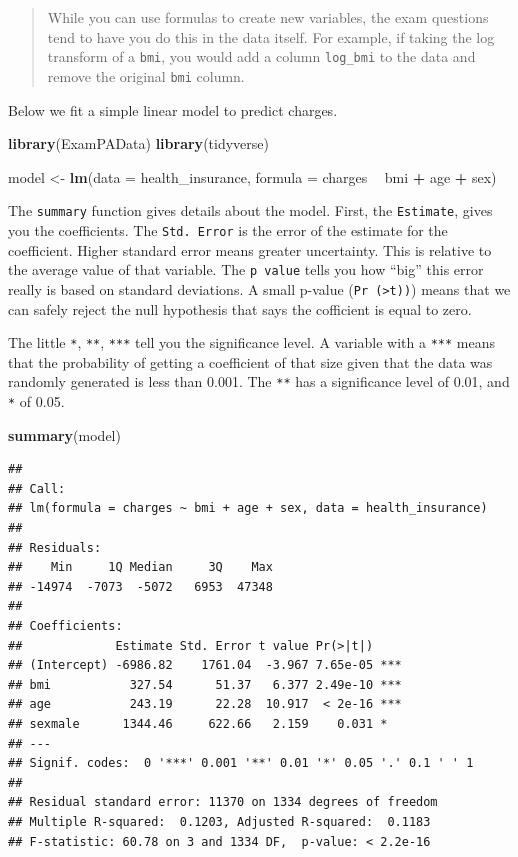 \documentclass[openany]{book}
\newenvironment{Shaded}{\begin{snugshade}}{\end{snugshade}}
\newcommand{\DataTypeTok}[1]{\textcolor[rgb]{0.13,0.29,0.53}{#1}}
\newcommand{\KeywordTok}[1]{\textcolor[rgb]{0.13,0.29,0.53}{\textbf{#1}}}
\newcommand{\NormalTok}[1]{#1}
\newcommand{\OperatorTok}[1]{\textcolor[rgb]{0.81,0.36,0.00}{\textbf{#1}}}
\newcommand{\StringTok}[1]{\textcolor[rgb]{0.31,0.60,0.02}{#1}}
\begin{document}
\begin{quote}
While you can use formulas to create new variables, the exam questions tend to have you do this in the data itself. For example, if taking the log transform of a \texttt{bmi}, you would add a column \texttt{log\_bmi} to the data and remove the original \texttt{bmi} column.
\end{quote}

Below we fit a simple linear model to predict charges.

\begin{Shaded}
\begin{Highlighting}[]
\KeywordTok{library}\NormalTok{(ExamPAData)}
\KeywordTok{library}\NormalTok{(tidyverse)}

\NormalTok{model <-}\StringTok{ }\KeywordTok{lm}\NormalTok{(}\DataTypeTok{data =}\NormalTok{ health_insurance, }\DataTypeTok{formula =}\NormalTok{ charges }\OperatorTok{~}\StringTok{ }\NormalTok{bmi }\OperatorTok{+}\StringTok{ }\NormalTok{age }\OperatorTok{+}\StringTok{ }\NormalTok{sex)}
\end{Highlighting}
\end{Shaded}

The \texttt{summary} function gives details about the model. First, the \texttt{Estimate}, gives you the coefficients. The \texttt{Std.\ Error} is the error of the estimate for the coefficient. Higher standard error means greater uncertainty. This is relative to the average value of that variable. The \texttt{p\ value} tells you how ``big'' this error really is based on standard deviations. A small p-value (\texttt{Pr\ (\textgreater{}\textbar{}t\textbar{}))}) means that we can safely reject the null hypothesis that says the cofficient is equal to zero.

The little \texttt{*}, \texttt{**}, \texttt{***} tell you the significance level. A variable with a \texttt{***} means that the probability of getting a coefficient of that size given that the data was randomly generated is less than 0.001. The \texttt{**} has a significance level of 0.01, and \texttt{*} of 0.05.

\begin{Shaded}
\begin{Highlighting}[]
\KeywordTok{summary}\NormalTok{(model)}
\end{Highlighting}
\end{Shaded}

\begin{verbatim}
## 
## Call:
## lm(formula = charges ~ bmi + age + sex, data = health_insurance)
## 
## Residuals:
##    Min     1Q Median     3Q    Max 
## -14974  -7073  -5072   6953  47348 
## 
## Coefficients:
##             Estimate Std. Error t value Pr(>|t|)    
## (Intercept) -6986.82    1761.04  -3.967 7.65e-05 ***
## bmi           327.54      51.37   6.377 2.49e-10 ***
## age           243.19      22.28  10.917  < 2e-16 ***
## sexmale      1344.46     622.66   2.159    0.031 *  
## ---
## Signif. codes:  0 '***' 0.001 '**' 0.01 '*' 0.05 '.' 0.1 ' ' 1
## 
## Residual standard error: 11370 on 1334 degrees of freedom
## Multiple R-squared:  0.1203, Adjusted R-squared:  0.1183 
## F-statistic: 60.78 on 3 and 1334 DF,  p-value: < 2.2e-16
\end{verbatim}
\end{document}
